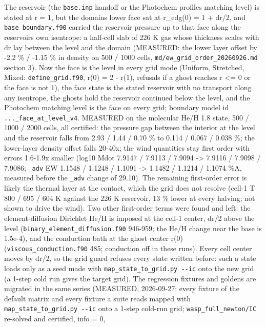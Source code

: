 \documentclass[english,a4paper]{my_memo}
\begin{document}
The reservoir (the \texttt{base.inp} handoff or the Photochem profile\textquotesingle s matching
level) is stated at r = 1, but the domain\textquotesingle s lower face sat at
r\_edg(0) = 1 + dr/2, and \texttt{base\_boundary.f90} carried the reservoir pressure
up to that face along the reservoir\textquotesingle s own isentrope: a half-cell slab of
226 K gas whose thickness scales with dr lay between the level and the
domain (MEASURED: the lower layer offset by -2.2 \% / -1.15 \% in density on
500 / 1000 cells, \texttt{md/ew\_grid\_order\_20260926.md} section 3). Now the face
is the level in every grid mode (Uniform, Stretched, Mixed:
\texttt{define\_grid.f90}, r(0) = 2 - r(1), refusals if a ghost reaches r \textless= 0 or
the face is not 1), the face state is the stated reservoir with no
transport along any isentrope, the ghosts hold the reservoir continued
below the level, and the Photochem matching level is the face on every
grid; boundary model id \texttt{...\_face\_at\_level\_v4}. MEASURED on the molecular
He/H 1.8 state, 500 / 1000 / 2000 cells, all certified: the pressure gap
between the interior at the level and the reservoir falls from 2.93 /
1.44 / 0.70 \% to 0.114 / 0.067 / 0.038 \%; the lower-layer density offset
falls 20-40x; the wind quantities stay first order with errors 1.6-1.9x
smaller (log10 Mdot 7.9147 / 7.9113 / 7.9094 -\textgreater{} 7.9116 / 7.9098 / 7.9086;
\texttt{\_adv} EW 1.1548 / 1.1248 / 1.1091 -\textgreater{} 1.1482 / 1.1214 / 1.1074 \%A, measured
before the \texttt{\_adv} change of 29.10). The remaining first-order error is
likely the thermal layer at the contact, which the grid does not resolve
(cell-1 T 800 / 695 / 604 K against the 226 K reservoir, 13 \% lower at every
halving; not shown to drive the wind). Two other first-order terms were
found and left: the element-diffusion Dirichlet He/H is imposed at the
cell-1 center, dr/2 above the level (\texttt{binary\_element\_diffusion.f90}
946-959; the He/H change near the base is 1.5e-4), and the conduction bath
at the ghost center r(0) (\texttt{viscous\_conduction.f90} 485; conduction off in
these runs). Every cell center moves by dr/2, so the grid guard refuses
every state written before: such a state loads only as a seed made with
\texttt{map\_state\_to\_grid.py\ -\/-ic} onto the new grid (a 1-step cold run gives the
target grid). The regression fixtures and goldens are migrated in the same
series (MEASURED, 2026-09-27: every fixture of the default matrix and every
fixture a suite reads mapped with \texttt{map\_state\_to\_grid.py\ -\/-ic} onto a 1-step
cold-run grid; \texttt{wasp\_full\_newton/IC} re-solved and certified, info = 0,
\end{document}
